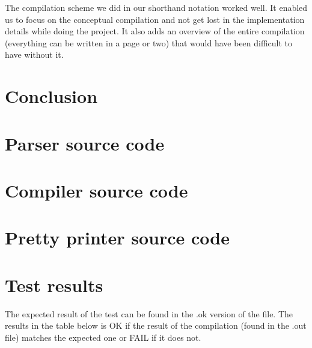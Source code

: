 \documentclass[11pt]{article}
\begin{document}
The compilation scheme we did in our shorthand notation worked well.
It enabled us to focus on the conceptual compilation and not get lost in the implementation details while doing the project.
It also adds an overview of the entire compilation (everything can be written in a page or two) that would have been difficult to have without it. 

\section{Conclusion}

{} 


\appendix
\section{Parser source code}
\label{app:parser}

\section{Compiler source code}
\label{app:compiler}

\section{Pretty printer source code}
\label{app:pretty}

\newpage

\section{Test results}
\label{app:testresults}
The expected result of the test can be found in the .ok version of the file. The results in the table below is OK if the result of the compilation (found in the .out file) matches the expected one or FAIL if it does not.
\end{document}
